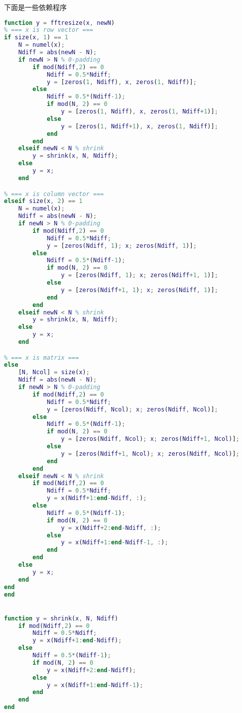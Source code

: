 下面是一些依赖程序
\begin{lstlisting}[language=matlab, caption=fftresize.m]
% resize vector/matrix length for ftt by zero padding on both ends
function y = fftresize(x, newN)
% === x is row vector ===
if size(x, 1) == 1 
    N = numel(x);
    Ndiff = abs(newN - N);
    if newN > N % 0-padding
        if mod(Ndiff,2) == 0
            Ndiff = 0.5*Ndiff;
            y = [zeros(1, Ndiff), x, zeros(1, Ndiff)];
        else
            Ndiff = 0.5*(Ndiff-1);
            if mod(N, 2) == 0
                y = [zeros(1, Ndiff), x, zeros(1, Ndiff+1)];
            else
                y = [zeros(1, Ndiff+1), x, zeros(1, Ndiff)];
            end
        end
    elseif newN < N % shrink
        y = shrink(x, N, Ndiff);
    else
        y = x;
    end

% === x is column vector ===
elseif size(x, 2) == 1
    N = numel(x);
    Ndiff = abs(newN - N);
    if newN > N % 0-padding
        if mod(Ndiff,2) == 0
            Ndiff = 0.5*Ndiff;
            y = [zeros(Ndiff, 1); x; zeros(Ndiff, 1)];
        else
            Ndiff = 0.5*(Ndiff-1);
            if mod(N, 2) == 0
                y = [zeros(Ndiff, 1); x; zeros(Ndiff+1, 1)];
            else
                y = [zeros(Ndiff+1, 1); x; zeros(Ndiff, 1)];
            end
        end
    elseif newN < N % shrink
        y = shrink(x, N, Ndiff);
    else
        y = x;
    end

% === x is matrix ===
else
    [N, Ncol] = size(x);
    Ndiff = abs(newN - N);
    if newN > N % 0-padding
        if mod(Ndiff,2) == 0
            Ndiff = 0.5*Ndiff;
            y = [zeros(Ndiff, Ncol); x; zeros(Ndiff, Ncol)];
        else
            Ndiff = 0.5*(Ndiff-1);
            if mod(N, 2) == 0
                y = [zeros(Ndiff, Ncol); x; zeros(Ndiff+1, Ncol)];
            else
                y = [zeros(Ndiff+1, Ncol); x; zeros(Ndiff, Ncol)];
            end
        end
    elseif newN < N % shrink
        if mod(Ndiff,2) == 0
            Ndiff = 0.5*Ndiff;
            y = x(Ndiff+1:end-Ndiff, :);
        else
            Ndiff = 0.5*(Ndiff-1);
            if mod(N, 2) == 0
                y = x(Ndiff+2:end-Ndiff, :);
            else
                y = x(Ndiff+1:end-Ndiff-1, :);
            end
        end
    else
        y = x;
    end
end
end


function y = shrink(x, N, Ndiff)
    if mod(Ndiff,2) == 0
        Ndiff = 0.5*Ndiff;
        y = x(Ndiff+1:end-Ndiff);
    else
        Ndiff = 0.5*(Ndiff-1);
        if mod(N, 2) == 0
            y = x(Ndiff+2:end-Ndiff);
        else
            y = x(Ndiff+1:end-Ndiff-1);
        end
    end
end
\end{lstlisting}

